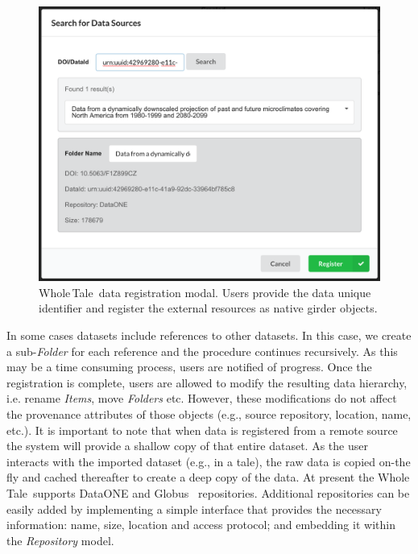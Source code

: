 \documentclass[review]{elsarticle}
\newcommand{\wt}{Whole\,Tale}
\begin{document}
\begin{figure}[ht!]
\centering
  \includegraphics[trim=0in 0in 0in 0in,clip,width=0.75\columnwidth]{register_modal.png}
  \caption{\wt\ data registration modal. Users provide the data unique
  identifier and register the external resources as native girder objects.
  \label{fig:reg_modal}}
\end{figure}

In some cases datasets include references to other datasets. In this case, 
we create a sub-\emph{Folder} for each reference and the procedure continues
recursively. As this may be a time consuming process, users are notified of 
progress. Once the
registration is complete, users are allowed to modify the resulting data
hierarchy, i.e. rename \emph{Items}, move \emph{Folders} etc. However, these
modifications do not affect the provenance attributes of those objects (e.g., 
source repository, location, name, etc.).
It is important to note that when data is registered from a remote source
the system will provide a shallow copy of that entire 
dataset. As the user interacts with the imported dataset (e.g., in a tale),
the raw data is copied on-the fly and 
cached thereafter to create a deep copy of the data. 
At present the \wt\ supports DataONE and Globus~\cite{chard14efficient} repositories. Additional repositories can be easily added by implementing
a simple interface that provides
the necessary information: name, size, location and access protocol;
and embedding it within the \emph{Repository} model.
\end{document}
